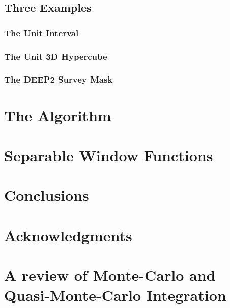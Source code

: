 \documentclass[usenatbib]{mn2e}
\begin{document}
\subsection{Three Examples}

\subsubsection{The Unit Interval}

\subsubsection{The Unit 3D Hypercube}

\subsubsection{The DEEP2 Survey Mask}

\section{The Algorithm}
\label{sec:alg}

\section{Separable Window Functions}
\label{sec:sep}

\section{Conclusions}
\label{sec:conclude}


\section{Acknowledgments}

\appendix

\section{A review of Monte-Carlo and Quasi-Monte-Carlo Integration}
\label{sec:review}
\end{document}

